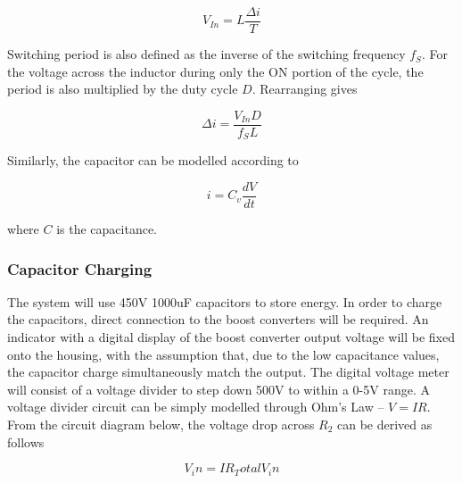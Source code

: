 \begin{equation}
	V_{In}=L\frac{\Delta i}{T}
\end{equation}

Switching period is also defined as the inverse of the switching frequency \(f_S\). For the voltage across the inductor during only the ON portion of the cycle, the period is also multiplied by the duty cycle \(D\). Rearranging gives

\begin{equation}
	\Delta i=\frac{V_{In} D}{f_S L}
\end{equation}

Similarly, the capacitor can be modelled according to

\begin{equation}
	i=C_v\frac{dV}{dt}
\end{equation}

where \(C\) is the capacitance.
\subsubsection{Capacitor Charging}

The system will use 450V 1000uF capacitors to store energy. In order to charge the capacitors, direct connection to the boost converters will be required. An indicator with a digital display of the boost converter output voltage will be fixed onto the housing, with the assumption that, due to the low capacitance values, the capacitor charge simultaneously match the output. The digital voltage meter will consist of a voltage divider to step down 500V to within a 0-5V range. A voltage divider circuit can be simply modelled through Ohm's Law -- \(V=IR\). From the circuit diagram below, the voltage drop across \(R_2\) can be derived as follows

\begin{equation}
	V_in=IR_Total
	V_in
\end{equation}
 